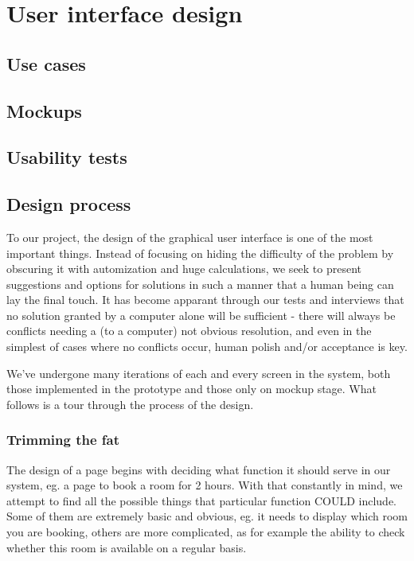 \chapter{User interface design}
\label{chap:user_interface_design}

\section{Use cases}
\label{sec:use_cases}

\section{Mockups} %
\label{sec:mockups}


\section{Usability tests} %
\label{sec:usability_tests}



\section{Design process}
\label{sec:design_process}
To our project, the design of the graphical user interface is one of the most important things. Instead of focusing on hiding the difficulty of the problem by obscuring it with automization and huge calculations, we seek to present suggestions and options for solutions in such a manner that a human being can lay the final touch. It has become apparant through our tests and interviews that no solution granted by a computer alone will be sufficient - there will always be conflicts needing a (to a computer) not obvious resolution, and even in the simplest of cases where no conflicts occur, human polish and/or acceptance is key.

We've undergone many iterations of each and every screen in the system, both those implemented in the prototype and those only on mockup stage. What follows is a tour through the process of the design.



\subsection{Trimming the fat}
The design of a page begins with deciding what function it should serve in our system, eg. a page to book a room for 2 hours. With that constantly in mind, we attempt to find all the possible things that particular function COULD include. Some of them are extremely basic and obvious, eg. it needs to display which room you are booking, others are more complicated, as for example the ability to check whether this room is available on a regular basis.


